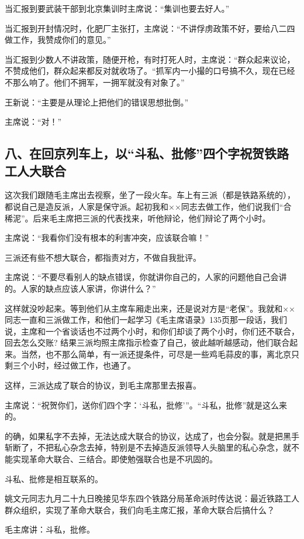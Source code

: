 当汇报到要武装干部到北京集训时主席说：“集训也要去好人。”

当汇报到开封情况时，化肥厂主张打，主席说：“不讲俘虏政策不好，要给八二四做工作，我赞成你们的意见。”

当汇报到少数人不讲政策，随便开枪，有时打死人时，主席说：“群众起来议论，不赞成他们，群众起来都反对就收场了。“抓军内一小撮的口号搞不久，现在已经不那么响了。他们不拥军，一拥军就没有对象了。”

王新说：“主要是从理论上把他们的错误思想批倒。”

主席说：“对！”

\subsection{八、在回京列车上，以“斗私、批修”四个字祝贺铁路工人大联合}


这次我们跟随毛主席出去视察，坐了一段火车。车上有三派（都是铁路系统的），都说自己是造反派，人家是保守派。起初我和××同志去做工作，他们说我们“合稀泥”。后来毛主席把三派的代表找来，听他辩论，他们辩论了两个小时。

主席说：“我看你们没有根本的利害冲突，应该联合嘛！”

三派还有些不想大联合，都指责对方，不做自我批评。

主席说：“不要尽看别人的缺点错误，你就讲你自己的，人家的问题他自己会讲的。人家的缺点应该人家讲，你讲什么？”

这样就没吵起来。等到他们从主席车厢走出来，还是说对方是“老保”。我就和××同志一直和三派做工作，和他们一起学习《毛主席语录》135页那一段话，我们说，主席和一个省谈话也不过两个小时，和你们却谈了两个小时，你们还不联合，回去怎么交账? 结果三派均照主席指示检查了自己，彼此越听越感动，他们联合起来。当然，也不那么简单，有一派还提条件，可尽是一些鸡毛蒜皮的事，离北京只剩三个小时，经过做工作，也通了。

这样，三派达成了联合的协议，到毛主席那里去报喜。

主席说：“祝贺你们，送你们四个字：‘斗私，批修'”。“斗私，批修”就是这么来的。

的确，如果私字不去掉，无法达成大联合的协议，达成了，也会分裂。就是把黑手斩断了，不把私心杂念去掉，特别是不去掉造反派领导人头脑里的私心杂念，就不能实现革命大联合、三结合。即使勉强联合也是不巩固的。

斗私、批修是相互联系的。

姚文元同志九月二十九日晚接见华东四个铁路分局革命派时传达说：最近铁路工人群众组织，实现了革命大联合，我们向毛主席汇报，革命大联合后搞什么？

毛主席讲：斗私，批修。
